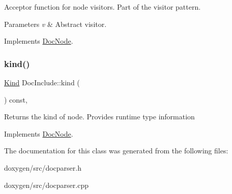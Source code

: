Acceptor function for node visitors. Part of the visitor pattern. 
\begin{DoxyParams}{Parameters}
{\em v} & Abstract visitor. \\
\hline
\end{DoxyParams}


Implements \mbox{\hyperlink{class_doc_node_a5303a550cbe6395663bf9b9dad28cbf1}{Doc\+Node}}.

\mbox{\label{class_doc_include_a947c64f6a61138a4790ebc8bffbda3e3}} 
\subsubsection{\texorpdfstring{kind()}{kind()}}
{\footnotesize\ttfamily \mbox{\hyperlink{class_doc_node_aebd16e89ca590d84cbd40543ea5faadb}{Kind}} Doc\+Include\+::kind (\begin{DoxyParamCaption}{ }\end{DoxyParamCaption}) const\hspace{0.3cm}{\ttfamily [inline]}, {\ttfamily [virtual]}}

Returns the kind of node. Provides runtime type information 

Implements \mbox{\hyperlink{class_doc_node_a108ffd214a72ba6e93dac084a8f58049}{Doc\+Node}}.



The documentation for this class was generated from the following files\+:\begin{DoxyCompactItemize}
\item 
doxygen/src/docparser.\+h\item 
doxygen/src/docparser.\+cpp\end{DoxyCompactItemize}
